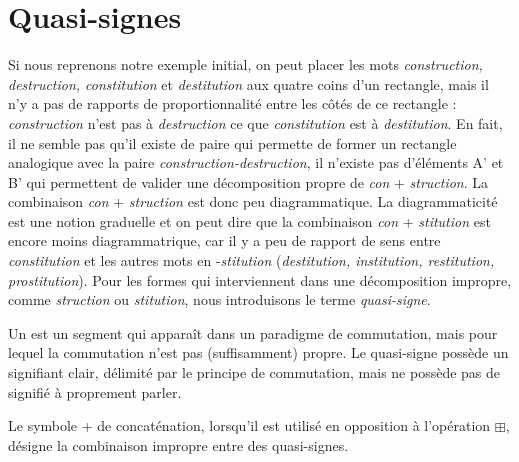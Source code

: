 \section{Quasi-signes}\label{sec:2.2.4}

Si nous reprenons notre exemple initial, on peut placer les mots \textit{construction,} \textit{destruction, constitution} et \textit{destitution} aux quatre coins d’un rectangle, mais il n’y a pas de rapports de proportionnalité entre les côtés de ce rectangle : \textit{construction} n’est pas à \textit{destruction} ce que \textit{constitution} est à \textit{destitution}. En fait, il ne semble pas qu’il existe de paire qui permette de former un rectangle analogique avec la paire \textit{construction-destruction}, il n’existe pas d’éléments A’ et B’ qui permettent de valider une décomposition propre de \textit{con} + \textit{struction}. La combinaison \textit{con} + \textit{struction} est donc peu diagrammatique. La diagrammaticité est une notion graduelle et on peut dire que la combinaison \textit{con} + \textit{stitution} est encore moins diagrammatrique, car il y a peu de rapport de sens entre \textit{constitution} et les autres mots en -\textit{stitution} (\textit{destitution, institution, restitution, prostitution}). Pour les formes qui interviennent dans une décomposition impropre, comme \textit{struction} ou \textit{stitution}, nous introduisons le terme \textit{quasi-signe}.

{Un  est un segment qui apparaît dans un paradigme de commutation, mais pour lequel la commutation n’est pas (suffisamment) propre. Le quasi-signe possède un signifiant clair, délimité par le principe de commutation, mais ne possède pas de signifié à proprement parler.}

Le symbole + de concaténation, lorsqu'il est utilisé en opposition à l’opération ${\boxplus}$, désigne la combinaison impropre entre des quasi-signes.

